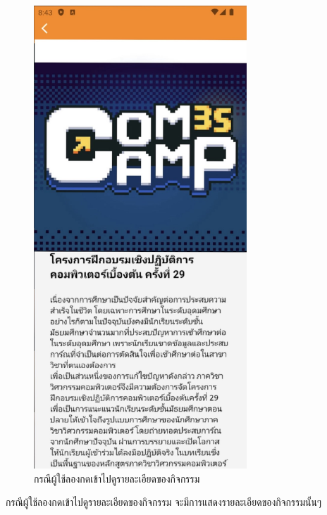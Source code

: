 \documentclass[14pt,oneside,openright,a4paper]{cpe-thai-project}
\begin{document}
\begin{figure}[!h]\centering
  \includegraphics[width=8cm]{./Pictures/Scene5.jpg}
  \caption{กรณีผู้ใช้ลองกดเข้าไปดูรายละเอียดของกิจกรรม}\label{fig:DetailEventPageTest}
\end{figure}
  \hspace*{1cm} กรณีผู้ใช้ลองกดเข้าไปดูรายละเอียดของกิจกรรม จะมีการแสดงรายละเอียดของกิจกรรมนั้นๆ

\newpage
\end{document}
